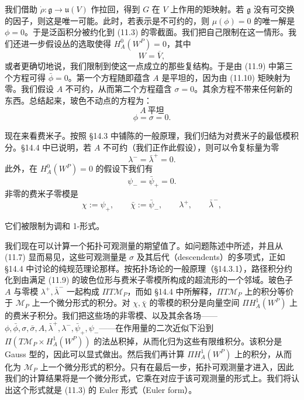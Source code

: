 我们借助 $\dot\rho:\mathfrak{g}\to\mathfrak{u}(V)$ 作拉回，得到 $G$ 在 $V$ 上作用的矩映射。若 $\mathfrak{g}$ 没有可交换的因子，则这是唯一可能。此时，若表示是不可约的，则 $\mu(\phi)=0$ 的唯一解是 $\phi=0$。于是泛函积分被约化到 (11.3) 的零截面。我们把自己限制在这一情形。我们还进一步假设丛的选取使得 $H^0_A(W^P)=0$，其中
\[
  W=\overline{V},
\]
或者更确切地说，我们限制到使这一点成立的那些复结构。于是由 (11.9) 中第三个方程可得 $\bar\phi=0$。第一个方程随即蕴含 $A$ 是平坦的，因为由 (11.10) 矩映射为零。我们假设 $A$ 不可约，从而第二个方程蕴含 $\sigma=0$。其余方程不带来任何新的东西。总结起来，玻色不动点的方程为：
\[
  A\ \text{平坦}
\]
\[
  \phi=\sigma=0.
\]

现在来看费米子。按照 §14.3 中铺陈的一般原理，我们归结为对费米子的最低模积分。§14.4 中已说明，若 $A$ 不可约（我们正作此假设），则可以令复标量为零
\[
  \lambda^-=\bar\lambda^+=0.
\]
此外，在 $H^0_A(W^P)=0$ 的假设下我们有
\[
  \psi_-=\bar\psi_+=0.
\]
非零的费米子零模是
\[
  \chi:=\psi_+,\qquad \bar\chi:=\bar\psi_-,\qquad \lambda^+,\qquad \bar\lambda^-,
\]


它们被限制为调和 1-形式。

我们现在可以计算一个拓扑可观测量的期望值了。如问题陈述中所述，并且从 (11.7) 显而易见，这些可观测量是 $\sigma$ 及其后代（descendents）的多项式，正如 §14.4 中讨论的纯规范理论那样。按拓扑场论的一般原理（§14.3.1），路径积分约化到由满足 (11.9) 的玻色位形与费米子零模所构成的超流形的一个邻域。玻色子 $A$ 与零模 $\lambda^+,\bar\lambda^-$ 一起构成 $\Pi T\mathcal{M}_P$，而如 §14.4 中所解释，$\Pi T\mathcal{M}_P$ 上的积分等价于 $\mathcal{M}_P$ 上一个微分形式的积分。对 $\chi,\bar\chi$ 的零模的积分是向量空间 $\Pi H^1_A(W^P)$ 上的费米子积分。我们把这些场的非零模、以及其余各场——$\phi,\bar\phi,\sigma,\bar\sigma,A,\bar\lambda^+,\lambda^-,\bar\psi_+,\psi_-$——在作用量的二次近似下沿到 $\Pi(T\mathcal{M}_P\times H^1_A(W^P))$ 的法丛积掉，从而化归为这些有限维积分。该积分是 Gauss 型的，因此可以显式做出。然后我们再计算 $\Pi H^1_A(W^P)$ 上的积分，从而化为 $\mathcal{M}_P$ 上一个微分形式的积分。只有在最后一步，拓扑可观测量才进入，因此我们的计算结果将是一个微分形式，它乘在对应于该可观测量的形式上。我们将认出这个形式就是 (11.3) 的 Euler 形式（Euler form）。


